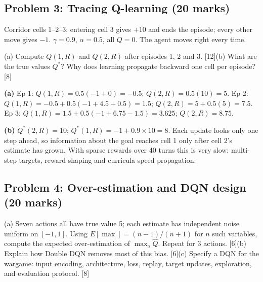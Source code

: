 \documentclass[11pt]{article}
\begin{document}
\subsection{Problem 3: Tracing Q-learning \normalfont\small\color{GreyN}(20 marks)}

\begin{prob}Corridor cells 1--2--3; entering cell 3 gives +10 and ends the episode; every other move gives $-1$. $\gamma=0.9$, $\alpha=0.5$, all $Q=0$. The agent moves right every time.

(a) Compute $Q(1,R)$ and $Q(2,R)$ after episodes 1, 2 and 3. [12]\newline (b) What are the true values $Q^*$? Why does learning propagate backward one cell per episode? [8]\end{prob}

\begin{soln}\textbf{(a)} Ep 1: $Q(1,R)=0.5(-1+0)=-0.5$; $Q(2,R)=0.5(10)=5$. Ep 2: $Q(1,R)=-0.5+0.5(-1+4.5+0.5)=\mathbf{1.5}$; $Q(2,R)=5+0.5(5)=\mathbf{7.5}$. Ep 3: $Q(1,R)=1.5+0.5(-1+6.75-1.5)=\mathbf{3.625}$; $Q(2,R)=\mathbf{8.75}$.

\textbf{(b)} $Q^*(2,R)=10$; $Q^*(1,R)=-1+0.9\times10=8$. Each update looks only one step ahead, so information about the goal reaches cell 1 only after cell 2's estimate has grown. With sparse rewards over 40 turns this is very slow: multi-step targets, reward shaping and curricula speed propagation.\end{soln}

\subsection{Problem 4: Over-estimation and DQN design \normalfont\small\color{GreyN}(20 marks)}

\begin{prob}(a) Seven actions all have true value 5; each estimate has independent noise uniform on $[-1,1]$. Using $E[\max]=(n-1)/(n+1)$ for $n$ such variables, compute the expected over-estimation of $\max_a\hat Q$. Repeat for 3 actions. [6]\newline (b) Explain how Double DQN removes most of this bias. [6]\newline (c) Specify a DQN for the wargame: input encoding, architecture, loss, replay, target updates, exploration, and evaluation protocol. [8]\end{prob}
\end{document}
